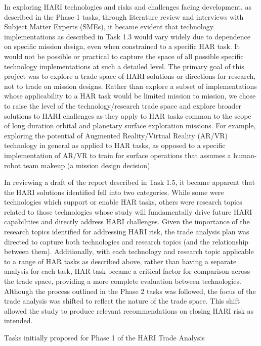 In exploring HARI technologies and risks and challenges facing development, as described in the Phase 1 tasks, through literature review and interviews with Subject Matter Experts (SMEs), it became evident that technology implementations as described in Task 1.3 would vary widely due to dependence on specific mission design, even when constrained to a specific HAR task.
It would not be possible or practical to capture the space of all possible specific technology implementations at such a detailed level.
The primary goal of this project was to explore a trade space of HARI solutions or directions for research, not to trade on mission designs.
Rather than explore a subset of implementations whose applicability to a HAR task would be limited mission to mission, we chose to raise the level of the technology/research trade space and explore broader solutions to HARI challenges as they apply to HAR tasks common to the scope of long duration orbital and planetary surface exploration missions.
For example, exploring the potential of Augmented Reality/Virtual Reality (AR/VR) technology in general as applied to HAR tasks, as opposed to a specific implementation of AR/VR to train for surface operations that assumes a human-robot team makeup (a mission design decision).

In reviewing a draft of the report described in Task 1.5, it became apparent that the HARI solutions identified fell into two categories.
While some were technologies which support or enable HAR tasks, others were research topics related to those technologies whose study will fundamentally drive future HARI capabilities and directly address HARI challenges.
Given the importance of the research topics identified for addressing HARI risk, the trade analysis plan was directed to capture both technologies and research topics (and the relationship between them).
Additionally, with each technology and research topic applicable to a range of HAR tasks as described above, rather than having a separate analysis for each task, HAR task became a critical factor for comparison across the trade space, providing a more complete evaluation between technologies.
Although the process outlined in the Phase 2 tasks was followed, the focus of the trade analysis was shifted to reflect the nature of the trade space.
This shift allowed the study to produce relevant recommendations on closing HARI risk as intended.

\begin{table}[tb]
    \centering
    \caption{Tasks initially proposed for Phase 1 of the HARI Trade Analysis}
    \label{table:phase1}
\end{table}

